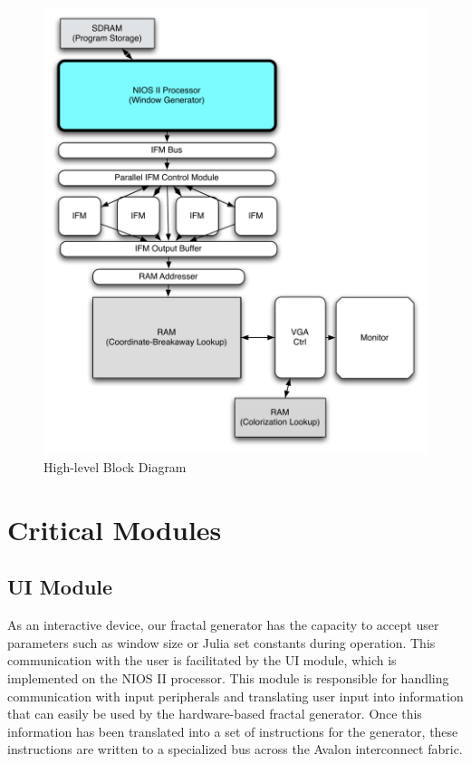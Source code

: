 \documentclass{article}
\begin{document}
\begin{figure}[H]
  \centering
	\includegraphics[width=\textwidth]{block_diagrams/top_level.pdf}
  \caption{High-level Block Diagram}
\end{figure}
\newpage

\section{Critical Modules}

\subsection{UI Module}

As an interactive device, our fractal generator has the capacity to accept user parameters such as window size or
Julia set constants during operation. This communication with the user is facilitated by the UI module, which is 
implemented on the NIOS II processor. This module is responsible for handling communication with input peripherals
and translating user input into information that can easily be used by the hardware-based fractal generator. Once 
this information has been translated into a set of instructions for the generator, these instructions are written
to a specialized bus across the Avalon interconnect fabric.
\end{document}
